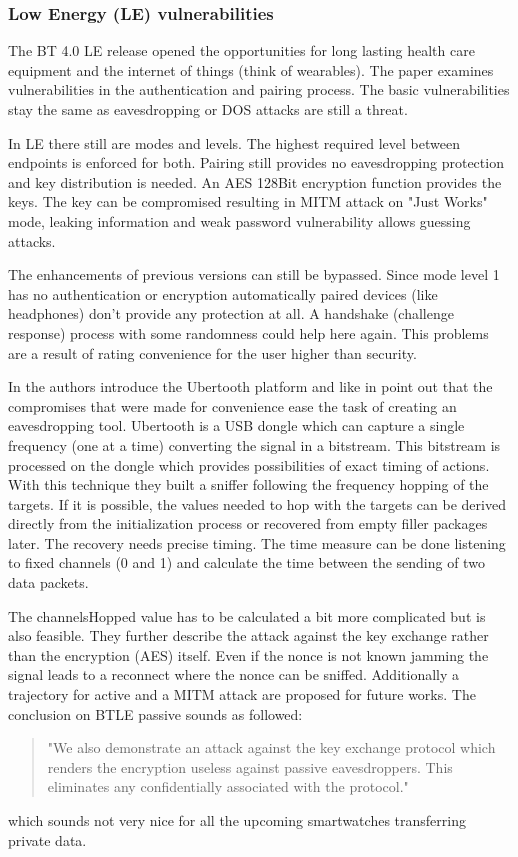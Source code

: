 \documentclass[12pt,a4paper]{article}
\begin{document}
\subsubsection{Low Energy (LE) vulnerabilities}
The BT 4.0 LE release opened the opportunities for long lasting health care equipment and the internet of things (think of wearables). The paper \cite{DBLP:conf/greencom/XuZLMLCSTY13} examines vulnerabilities in the authentication and pairing process. The basic vulnerabilities stay the same as eavesdropping or DOS attacks are still a threat.

In LE there still are modes and levels. The highest required level between endpoints is enforced for both. Pairing still provides no eavesdropping protection and key distribution is needed. An AES 128Bit encryption function provides the keys. The key can be compromised resulting in MITM attack on "Just Works" mode, leaking information and weak password vulnerability allows guessing attacks.

The enhancements of previous versions can still be bypassed. Since mode level 1 has no authentication or encryption automatically paired devices (like headphones) don't provide any protection at all. A handshake (challenge response) process with some randomness could help here again. This problems are a result of rating convenience for the user higher than security.

In \cite{DBLP:conf/woot/Ryan13} the authors introduce the Ubertooth platform and like in \cite{DBLP:conf/greencom/XuZLMLCSTY13} point out that the compromises that were made for convenience ease the task of creating an eavesdropping tool. Ubertooth is a USB dongle which can capture a single frequency (one at a time) converting the signal in a bitstream. This bitstream is processed on the dongle which provides possibilities of exact timing of actions. With this technique they built a sniffer following the frequency hopping of the targets. If it is possible, the values needed to hop with the targets can be derived directly from the initialization process or recovered from empty filler packages later. The recovery needs precise timing. The time measure can be done listening to fixed channels (0 and 1) and calculate the time between the sending of two data packets.

The channelsHopped value has to be calculated a bit more complicated but is also feasible. They further describe the attack against the key exchange rather than the encryption (AES) itself. Even if the nonce is not known jamming the signal leads to a reconnect where the nonce can be sniffed. Additionally a trajectory for active and a MITM attack are proposed for future works.
The conclusion on BTLE passive sounds as followed:
\begin{quote}
	"We also demonstrate an attack against the key exchange protocol which renders the encryption useless against passive eavesdroppers. This eliminates any confidentially associated with the protocol."\cite{DBLP:conf/woot/Ryan13}
\end{quote}
which sounds not very nice for all the upcoming smartwatches transferring private data.
\end{document}
